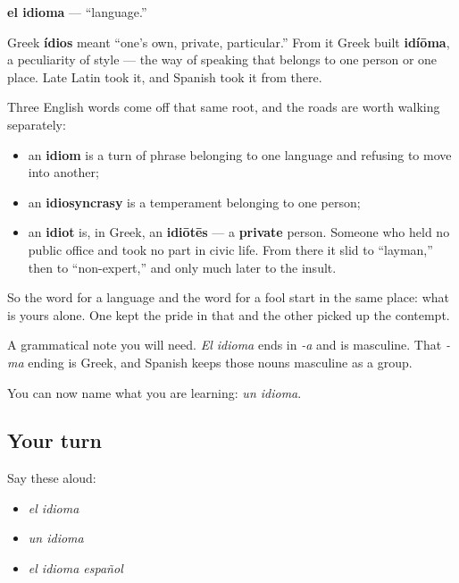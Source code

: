 \begin{cousinweb}
\textbf{el idioma} — \textquotedblleft{}language.\textquotedblright{}

Greek \textbf{ídios} meant \textquotedblleft{}one's own, private, particular.\textquotedblright{} From it Greek built \textbf{idíōma}, a peculiarity of style — the way of speaking that belongs to one person or one place. Late Latin took it, and Spanish took it from there.

Three English words come off that same root, and the roads are worth walking separately:

\begin{itemize}
\raggedright
  \item an \textbf{idiom} is a turn of phrase belonging to one language and refusing to move into another;
  \item an \textbf{idiosyncrasy} is a temperament belonging to one person;
  \item an \textbf{idiot} is, in Greek, an \textbf{idiōtēs} — a \textbf{private} person. Someone who held no public office and took no part in civic life. From there it slid to \textquotedblleft{}layman,\textquotedblright{} then to \textquotedblleft{}non-expert,\textquotedblright{} and only much later to the insult.
\end{itemize}

So the word for a language and the word for a fool start in the same place: what is yours alone. One kept the pride in that and the other picked up the contempt.

A grammatical note you will need. \emph{El idioma} ends in \emph{-a} and is masculine. That \emph{-ma} ending is Greek, and Spanish keeps those nouns masculine as a group.
\end{cousinweb}

\begin{grammarlens}[title={What you've built}]
You can now name what you are learning: \emph{un idioma}.
\end{grammarlens}

\subsection*{Your turn}
Say these aloud:

\begin{itemize}
\raggedright
  \item \emph{el idioma}
  \item \emph{un idioma}
  \item \emph{el idioma español}
\end{itemize}

